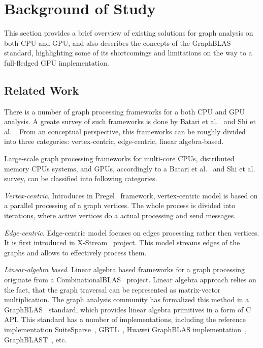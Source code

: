 \section{Background of Study}

This section provides a brief overview of existing solutions for graph analysis on both CPU and GPU, and also describes the concepts of the GraphBLAS standard, highlighting some of its shortcomings and limitations on the way to a full-fledged GPU implementation.

\subsection{Related Work}

There is a number of graph processing frameworks for a both CPU and GPU analysis. A greate survey of such frameworks is done by Batari et al.~\cite{article:batarfi_survey_graphs} and Shi et al.~\cite{article:shi_survey_graphs}. From an conceptual perspective, this frameworks can be roughly divided into three categories: vertex-centric, edge-centric, linear algebra-based.

Large-scale graph processing frameworks for multi-core CPUs, distributed memory CPUs systems, and GPUs, accordingly to a Batari et al.~\cite{article:batarfi_survey_graphs} and Shi et al.~\cite{article:shi_survey_graphs} survey, can be classified into following categories.

\textit{Vertex-centric}. Introduces in Pregel~\cite{article:pregel} framework, vertex-centric model is based on a parallel processing of a graph vertices. The whole process is divided into iterations, where active vertices do a actual processing and send messages.  

\textit{Edge-centric}. Edge-centric model focuses on edges processing rather then vertices. It is first introduced in X-Stream~\cite{article:xstream} project. This model streams edges of the graphs and allows to effectively process them. 

\textit{Linear-algebra based}. Linear algebra based frameworks for a graph processing originate from a CombinationalBLAS~\cite{article:combblas} project. Linear algebra approach relies on the fact, that the graph traversal can be represented as matrix-vector multiplication. The graph analysis community has formalized this method in a GraphBLAS~\cite{7761646} standard, which provides linear algebra primitives in a form of C API. This standard has a number of implementations, including the reference implementation SuiteSparse~\cite{10.1145/3322125}, GBTL~\cite{7529957}, Huawei GraphBLAS implementation~\cite{article:hu_graphblas_impl}, GraphBLAST~\cite{yang2019graphblast}, etc.

